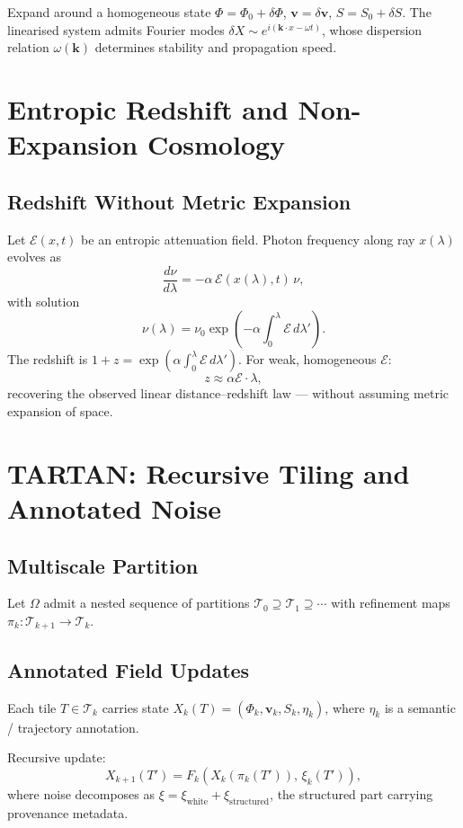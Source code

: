 \documentclass[11pt, openany]{book}
\theoremstyle{plain}
\theoremstyle{definition}
\theoremstyle{remark}
\begin{document}
Expand around a homogeneous state
$\Phi=\Phi_0+\delta\Phi$, $\mathbf{v}=\delta\mathbf{v}$, $S=S_0+\delta S$.
The linearised system admits Fourier modes
$\delta X\sim e^{i(\mathbf{k}\cdot x-\omega t)}$,
whose dispersion relation $\omega(\mathbf{k})$ determines stability and
propagation speed.

\chapter{Entropic Redshift and Non-Expansion Cosmology}

\section{Redshift Without Metric Expansion}

Let $\mathcal{E}(x,t)$ be an entropic attenuation field. Photon frequency
along ray $x(\lambda)$ evolves as
\[
  \frac{d\nu}{d\lambda}=-\alpha\,\mathcal{E}(x(\lambda),t)\,\nu,
\]
with solution
\[
  \nu(\lambda)=\nu_0\exp\!\left(-\alpha\int_0^\lambda\mathcal{E}\,d\lambda'\right).
\]
The redshift is
$1+z = \exp\!\left(\alpha\int_0^\lambda\mathcal{E}\,d\lambda'\right)$.
For weak, homogeneous $\mathcal{E}$:
\[
  z\approx\alpha\mathcal{E}\cdot\lambda,
\]
recovering the observed linear distance--redshift law --- without assuming
metric expansion of space.

\chapter{TARTAN: Recursive Tiling and Annotated Noise}

\section{Multiscale Partition}

Let $\Omega$ admit a nested sequence of partitions
$\mathcal{T}_0\supseteq\mathcal{T}_1\supseteq\cdots$ with refinement maps
$\pi_k:\mathcal{T}_{k+1}\to\mathcal{T}_k$.

\section{Annotated Field Updates}

Each tile $T\in\mathcal{T}_k$ carries state
$X_k(T)=(\Phi_k,\mathbf{v}_k,S_k,\eta_k)$,
where $\eta_k$ is a semantic / trajectory annotation.

Recursive update:
\[
  X_{k+1}(T')=F_k\!\left(X_k(\pi_k(T')),\,\xi_k(T')\right),
\]
where noise decomposes as $\xi=\xi_\text{white}+\xi_\text{structured}$,
the structured part carrying provenance metadata.
\end{document}
